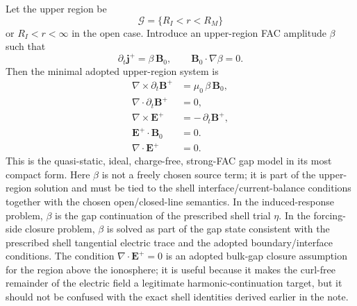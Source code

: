 \documentclass[11pt,a4paper]{article}
\begin{document}
Let the upper region be
\[
\mathcal G=\{R_I<r<R_M\}
\]
or \(R_I<r<\infty\) in the open case. Introduce an upper-region FAC amplitude
\(\beta\) such that
\[
\partial_t\mathbf j^+ = \beta\,\mathbf B_0,
\qquad
\mathbf B_0\cdot\nabla\beta = 0.
\]
Then the minimal adopted upper-region system is
\begin{align}
\nabla\times \partial_t\mathbf B^+ &= \mu_0\,\beta\,\mathbf B_0,
\label{eq:gap_bvp_ampere}
\\
\nabla\cdot \partial_t\mathbf B^+ &= 0,
\label{eq:gap_bvp_divb}
\\
\nabla\times \mathbf E^+ &= -\,\partial_t\mathbf B^+,
\label{eq:gap_bvp_faraday}
\\
\mathbf E^+\cdot \mathbf B_0 &= 0.
\label{eq:gap_bvp_ideality}
\\
\nabla\cdot \mathbf E^+ &= 0.
\label{eq:gap_bvp_dive}
\end{align}
This is the quasi-static, ideal, charge-free, strong-FAC gap model in its most
compact form. Here \(\beta\) is not a freely chosen source term; it is part of
the upper-region solution and must be tied to the shell interface/current-balance
conditions together with the chosen open/closed-line semantics. In the
induced-response problem, \(\beta\) is the gap continuation of the prescribed
shell trial \(\eta\). In the forcing-side closure problem, \(\beta\) is solved
as part of the gap state consistent with the prescribed shell tangential
electric trace and the adopted boundary/interface conditions. The condition
\(\nabla\cdot \mathbf E^+=0\) is an adopted bulk-gap closure assumption for the
region above the ionosphere; it is useful because it makes the curl-free
remainder of the electric field a legitimate harmonic-continuation target, but
it should not be confused with the exact shell identities derived earlier in
the note.
\end{document}
